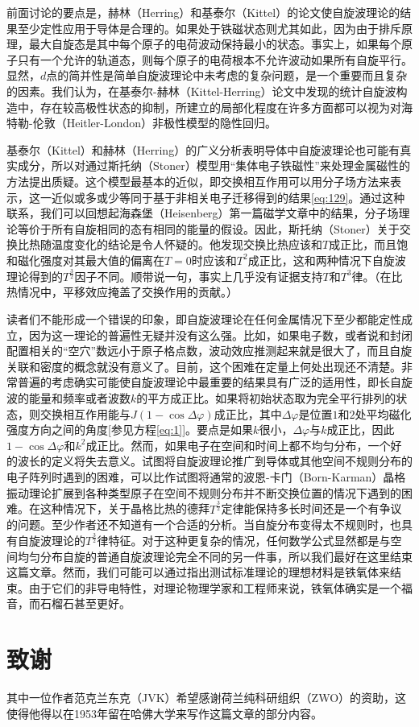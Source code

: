 \documentclass{article}
\begin{document}
前面讨论的要点是，赫林（Herring）和基泰尔（Kittel）的论文使自旋波理论的结果至少定性应用于导体是合理的。如果处于铁磁状态则尤其如此，因为由于排斥原理，最大自旋态是其中每个原子的电荷波动保持最小的状态。事实上，如果每个原子只有一个允许的轨道态，则每个原子的电荷根本不允许波动如果所有自旋平行。显然，$d$点的简并性是简单自旋波理论中未考虑的复杂问题，是一个重要而且复杂的因素。我们认为，在基泰尔-赫林（Kittel-Herring）论文中发现的统计自旋波构造中，存在较高极性状态的抑制，所建立的局部化程度在许多方面都可以视为对海特勒-伦敦（Heitler-London）非极性模型的隐性回归。

基泰尔（Kittel）和赫林（Herring）的广义分析表明导体中自旋波理论也可能有真实成分，所以对通过斯托纳（Stoner）模型用“集体电子铁磁性”来处理金属磁性的方法提出质疑。这个模型最基本的近似，即交换相互作用可以用分子场方法来表示，这一近似或多或少等同于基于非相关电子迁移得到的结果\eqref{eq:129}。通过这种联系，我们可以回想起海森堡（Heisenberg）第一篇磁学文章中的结果，分子场理论等价于所有自旋相同的态有相同的能量的假设。因此，斯托纳（Stoner）关于交换比热随温度变化的结论是令人怀疑的。他发现交换比热应该和$T$成正比，而且饱和磁化强度对其最大值的偏离在$T=0$时应该和$T^2$成正比，这和两种情况下自旋波理论得到的$T^\frac{3}{2}$因子不同。顺带说一句，事实上几乎没有证据支持$T$和$T^3$律。（在比热情况中，平移效应掩盖了交换作用的贡献。）

读者们不能形成一个错误的印象，即自旋波理论在任何金属情况下至少都能定性成立，因为这一理论的普遍性无疑并没有这么强。比如，如果电子数，或者说和封闭配置相关的“空穴”数远小于原子格点数，波动效应推测起来就是很大了，而且自旋关联和密度的概念就没有意义了。目前，这个困难在定量上何处出现还不清楚。非常普遍的考虑确实可能使自旋波理论中最重要的结果具有广泛的适用性，即长自旋波的能量和频率或者波数$k$的平方成正比。如果将初始状态取为完全平行排列的状态，则交换相互作用能与$J(1-\cos\Delta\varphi)$成正比，其中$\Delta\varphi$是位置$1$和$2$处平均磁化强度方向之间的角度[参见方程\eqref{eq:1}]。要点是如果$k$很小，$\Delta\varphi$与$k$成正比，因此$1-\cos\Delta\varphi$和$k^2$成正比。然而，如果电子在空间和时间上都不均匀分布，一个好的波长的定义将失去意义。试图将自旋波理论推广到导体或其他空间不规则分布的电子阵列时遇到的困难，可以比作试图将通常的波恩-卡门（Born-Karman）晶格振动理论扩展到各种类型原子在空间不规则分布并不断交换位置的情况下遇到的困难。在这种情况下，关于晶格比热的德拜$T^\frac{3}{2}$定律能保持多长时间还是一个有争议的问题。至少作者还不知道有一个合适的分析。当自旋分布变得太不规则时，也具有自旋波理论的$T^\frac{3}{2}$律特征。对于这种更复杂的情况，任何数学公式显然都是与空间均匀分布自旋的普通自旋波理论完全不同的另一件事，所以我们最好在这里结束这篇文章。然而，我们可能可以通过指出测试标准理论的理想材料是铁氧体来结束。由于它们的非导电特性，对理论物理学家和工程师来说，铁氧体确实是一个福音，而石榴石甚至更好。




\section*{致谢}

其中一位作者范克兰东克（JVK）希望感谢荷兰纯科研组织（ZWO）的资助，这使得他得以在1953年留在哈佛大学来写作这篇文章的部分内容。
\end{document}

